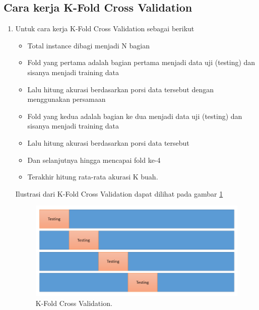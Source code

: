 \subsection{Cara kerja K-Fold Cross Validation}
\begin{enumerate}
\item Untuk cara kerja K-Fold Cross Validation sebagai berikut
	\begin{itemize}
		\item Total instance dibagi menjadi N bagian
		\item Fold yang pertama adalah bagian pertama menjadi data uji (testing) dan sisanya menjadi training data
		\item Lalu hitung akurasi berdasarkan porsi data tersebut dengan menggunakan persamaan
		\item Fold yang kedua adalah bagian ke dua menjadi data uji (testing) dan sisanya menjadi training data
		\item Lalu hitung akurasi berdasarkan porsi data tersebut
		\item Dan selanjutnya hingga mencapai fold ke-4
		\item Terakhir hitung rata-rata akurasi K buah.
	\end{itemize}
\subitem Ilustrasi dari K-Fold Cross Validation dapat dilihat pada gambar \ref{KF}
		\begin{figure}[ht]
		\centerline{\includegraphics[width=1\textwidth]{figures/im/im55.png}}
		\caption{K-Fold Cross Validation.}
		\label{KF}
		\end{figure}
\end{enumerate}

